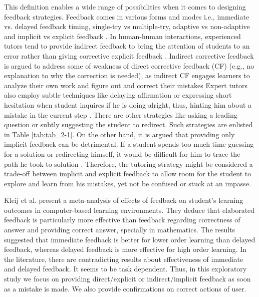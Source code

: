 This definition enables a wide range of possibilities when it comes to designing feedback strategies. Feedback comes in various forms and modes i.e., immediate vs. delayed feedback timing, single-try vs multiple-try, adaptive vs non-adaptive and implicit vs explicit feedback \parencite{narciss2008feedback}. In human-human interactions, experienced tutors tend to provide indirect feedback to bring the attention of students to an error rather than giving corrective explicit feedback \parencite{lepper1990self}. Indirect corrective feedback is argued to address some of weakness of direct corrective feedback (CF) (e.g., no explanation to why the correction is needed), as indirect CF engages learners to analyze their own work and figure out and correct their mistakes Expert tutors also employ subtle techniques like delaying affirmation or expressing short hesitation when student inquires if he is doing alright, thus, hinting him about a mistake in the current step \parencite{fox1991cognitive}. There are other strategies like asking a leading question or subtly suggesting the student to redirect. Such strategies are enlisted in Table \ref{tab:tab_2-1}. On the other hand, it is argued that providing only implicit feedback can be detrimental. If a student spends too much time guessing for a solution or redirecting himself, it would be difficult for him to trace the path he took to solution \parencite{lewis1985discrimination}. Therefore, the tutoring strategy might be considered a trade-off between implicit and explicit feedback to allow room for the student to explore and learn from his mistakes, yet not be confused or stuck at an impasse. 



Kleij et al. \parencite{van2015effects} present a meta-analysis of effects of feedback on  student's learning outcomes in computer-based learning environments. They deduce that elaborated feedback is particularly more effective than feedback regarding correctness of answer and providing correct answer, specially in mathematics. The results suggested that immediate feedback is better for lower order learning than delayed feedback, whereas delayed feedback is more effective for high order learning. In the literature, there are contradicting results about effectiveness of immediate and delayed feedback. It seems to be task dependent. Thus, in this exploratory study we focus on providing direct/explicit or indirect/implicit feedback as soon as a mistake is made. We also provide confirmations on correct actions of user.  


